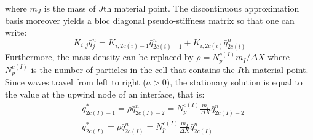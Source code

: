 where $m_J$ is the mass of $J$th material point. The discontinuous approximation basis moreover yields a bloc diagonal pseudo-stiffness matrix so that one can write:
\begin{equation}
  \label{eq:block_diag_K}
  K_{i,j} \bar{q}_{j}^{n}= K_{i,2c(i)-1} \bar{q}_{2c(i)-1}^{n}+K_{i,2c(i)} \bar{q}_{2c(i)}^{n}
\end{equation}
Furthermore, the mass density can be replaced by $\rho = N_p^{c( I)} m_I/\Delta X$ where $N_p^{c( I)}$ is the number of particles in the cell that contains the $I$th material point. Since waves travel from left to right ($a>0$), the stationary solution is equal to the value at the upwind node of an interface, that is:
\begin{align}
  & q_{2c(I)-1}^* = \rho \bar{q}^n_{2c(I)-2}=  N_p^{c( I)}\frac{ m_I}{\Delta X}\bar{q}^n_{2c(I)-2} \\
  & q_{2c(I)}^* = \rho \bar{q}^n_{2c(I)} =  N_p^{c( I)}\frac{ m_I}{\Delta X} \bar{q}^n_{2c(I)} 
\end{align}

